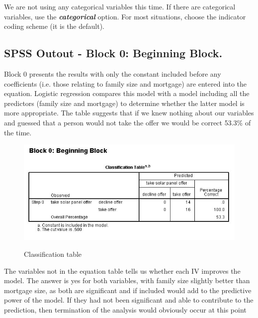 \documentclass[a4paper,12pt]{article}
\begin{document}
We are not using any categorical variables this time. If there are categorical variables, use the \textbf{\textit{categorical}} option. For most situations, choose the indicator coding scheme (it is the
default).
\subsection{SPSS Outout  - Block 0: Beginning Block.}
Block 0 presents the results with only the constant included
before any coefficients (i.e. those relating to family size and mortgage) are entered into
the equation. Logistic regression compares this model with a model including all the
predictors (family size and mortgage) to determine whether the latter model is more
appropriate. The table suggests that if we knew nothing about our variables and guessed
that a person would not take the offer we would be correct 53.3\% of the time.
\begin{figure}[h!]
\begin{center}
  \includegraphics[scale=0.6]{images/Logistic3}\\
  \caption{Classification table}
\end{center}
\end{figure}
The variables not in the equation table tells us whether each IV improves the model. The answer is yes for both variables, with family size slightly better than mortgage size, as both are significant and if included would add to the predictive power of the model. If they had not been significant and able to contribute to the prediction,
then termination of the analysis would obviously occur at this point
\end{document}
